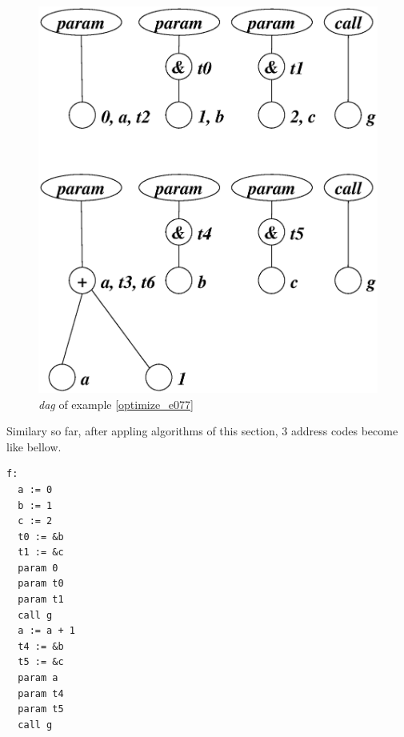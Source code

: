 \begin{Example}
\begin{figure}[htbp]
\begin{center}
\begin{latexonly}
\includegraphics[width=1.0\linewidth,height=0.894\linewidth]{opt032.eps}
\end{latexonly}
\caption{{\em dag} of example \ref{optimize_e077}}
\label{optimize_e078}
\end{center}
\end{figure}
Similary so far,
after appling algorithms of this section,
3 address codes become like bellow.
\begin{verbatim}
f:
  a := 0
  b := 1
  c := 2
  t0 := &b
  t1 := &c
  param 0
  param t0
  param t1
  call g
  a := a + 1
  t4 := &b
  t5 := &c
  param a
  param t4
  param t5
  call g
\end{verbatim}
\end{Example}

